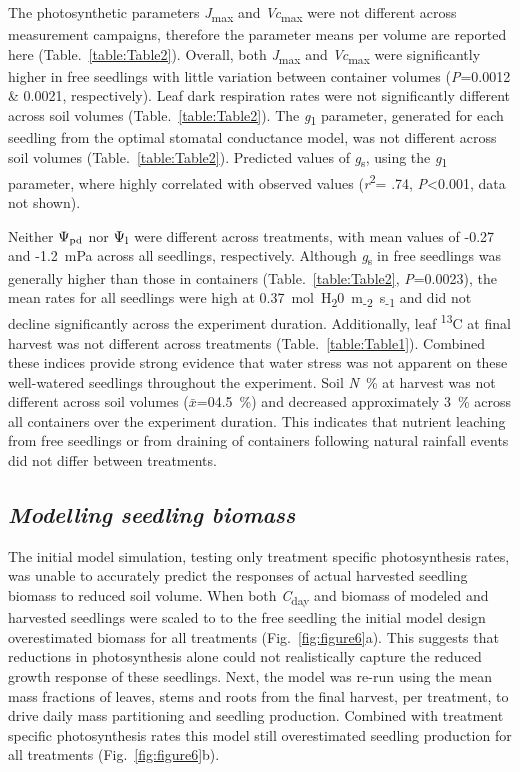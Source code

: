 \documentclass[a4paper]{article}\usepackage[]{graphicx}\usepackage[]{color}
\begin{document}
The photosynthetic parameters \textit{J}\textsubscript{max} and \textit{Vc}\textsubscript{max} were not different across measurement campaigns, therefore the parameter means per volume are reported here (Table.~\ref{table:Table2}).  Overall, both \textit{J}\textsubscript{max} and \textit{Vc}\textsubscript{max} were significantly higher in free seedlings with little variation between container volumes (\textit{P}=0.0012 \& 0.0021, respectively). Leaf dark respiration rates were not significantly different across soil volumes (Table.~\ref{table:Table2}). The \textit{g}\textsubscript{1} parameter, generated for each seedling from the \citet{medlyn2012reconciling} optimal stomatal conductance model, was not different across soil volumes (Table.~\ref{table:Table2}). Predicted values of \textit{g}\textsubscript{s}, using the \textit{g}\textsubscript{1} parameter, where highly correlated with observed values (\textit{r}\textsuperscript{2}= .74, \textit{P}\textless0.001, data not shown).

Neither $\Psi\textsubscript{pd}$ nor $\Psi\textsubscript{l}$ were different across treatments, with mean values of -0.27 and -1.2~mPa across all seedlings, respectively. Although \textit{g}\textsubscript{s} in free seedlings was generally higher than those in containers (Table.~\ref{table:Table2}, \textit{P}=0.0023), the mean rates for all seedlings were high at 0.37~mol~H\textsubscript{2}0~m\textsubscript{-2}~s\textsubscript{-1} and did not decline significantly across the experiment duration. Additionally, leaf {\textdelta}\textsuperscript{13}C at final harvest was not different across treatments (Table.~\ref{table:Table1}). Combined these indices provide strong evidence that water stress was not apparent on these well-watered seedlings throughout the experiment. Soil \textit{N}~\% at harvest was not different across soil volumes ($\bar{x}$=04.5~\%) and decreased approximately 3~\% across all containers over the experiment duration. This indicates that nutrient leaching from free seedlings or from draining of containers following natural rainfall events did not differ between treatments. 

\subsection*{\textit{Modelling seedling biomass}}
The initial model simulation, testing only treatment specific photosynthesis rates, was unable to accurately predict the responses of actual harvested seedling biomass to reduced soil volume.  When both \textit{C}\textsubscript{day} and biomass of modeled and harvested seedlings were scaled to to the free seedling the initial model design overestimated biomass for all treatments (Fig.~\ref{fig:figure6}a).  This suggests that reductions in photosynthesis alone could not realistically capture the reduced growth response of these seedlings.  Next, the model was re-run using the mean mass fractions of leaves, stems and roots from the final harvest, per treatment, to drive daily mass partitioning and seedling production.  Combined with treatment specific photosynthesis rates this model still overestimated seedling production for all treatments (Fig.~\ref{fig:figure6}b).  
\end{document}
